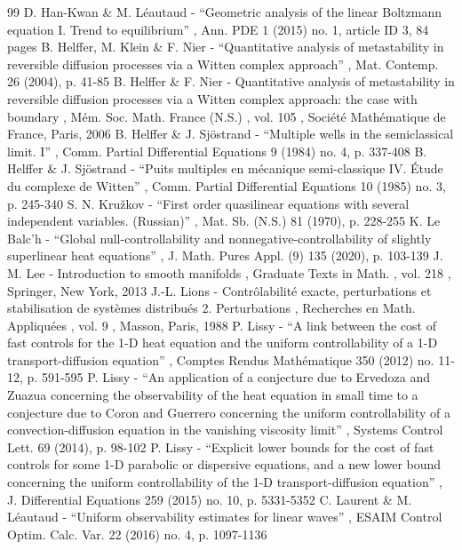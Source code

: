 \documentclass[10pt]{amsart}
\theoremstyle{definition}
\begin{document}
\begin{thebibliography}{99}
 D. Han-Kwan \& M. Léautaud - “Geometric analysis of the linear Boltzmann equation I. Trend to equilibrium” , Ann. PDE 1 (2015) no. 1, article ID 3, 84 pages
 B. Helffer, M. Klein \& F. Nier - “Quantitative analysis of metastability in reversible diffusion processes via a Witten complex approach” , Mat. Contemp. 26 (2004), p. 41-85
 B. Helffer \& F. Nier - Quantitative analysis of metastability in reversible diffusion processes via a Witten complex approach: the case with boundary , Mém. Soc. Math. France (N.S.) , vol. 105 , Société Mathématique de France, Paris, 2006
 B. Helffer \& J. Sjöstrand - “Multiple wells in the semiclassical limit. I” , Comm. Partial Differential Equations 9 (1984) no. 4, p. 337-408
 B. Helffer \& J. Sjöstrand - “Puits multiples en mécanique semi-classique IV. Étude du complexe de Witten” , Comm. Partial Differential Equations 10 (1985) no. 3, p. 245-340
 S. N. Kružkov - “First order quasilinear equations with several independent variables. (Russian)” , Mat. Sb. (N.S.) 81 (1970), p. 228-255
 K. Le Balc’h - “Global null-controllability and nonnegative-controllability of slightly superlinear heat equations” , J. Math. Pures Appl. (9) 135 (2020), p. 103-139
 J. M. Lee - Introduction to smooth manifolds , Graduate Texts in Math. , vol. 218 , Springer, New York, 2013
 J.-L. Lions - Contrôlabilité exacte, perturbations et stabilisation de systèmes distribués 2. Perturbations , Recherches en Math. Appliquées , vol. 9 , Masson, Paris, 1988
 P. Lissy - “A link between the cost of fast controls for the 1-D heat equation and the uniform controllability of a 1-D transport-diffusion equation” , Comptes Rendus Mathématique 350 (2012) no. 11-12, p. 591-595
 P. Lissy - “An application of a conjecture due to Ervedoza and Zuazua concerning the observability of the heat equation in small time to a conjecture due to Coron and Guerrero concerning the uniform controllability of a convection-diffusion equation in the vanishing viscosity limit” , Systems Control Lett. 69 (2014), p. 98-102
 P. Lissy - “Explicit lower bounds for the cost of fast controls for some 1-D parabolic or dispersive equations, and a new lower bound concerning the uniform controllability of the 1-D transport-diffusion equation” , J. Differential Equations 259 (2015) no. 10, p. 5331-5352
 C. Laurent \& M. Léautaud - “Uniform observability estimates for linear waves” , ESAIM Control Optim. Calc. Var. 22 (2016) no. 4, p. 1097-1136

\end{thebibliography}
\end{document}
